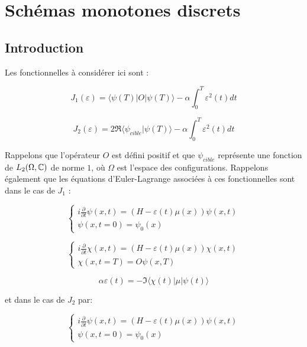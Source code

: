 \chapter{Schémas monotones discrets}

\section{Introduction}
Les fonctionnelles à considérer ici sont :

\begin{equation}
J_1(\varepsilon) = \langle \psi(T)|O|\psi(T) \rangle - \alpha \int_0^T \varepsilon^2(t)dt
\end{equation}

\begin{equation}
J_2(\varepsilon) = 2\Re\langle \psi_{cible}|\psi(T)\rangle - \alpha \int_0^T \varepsilon^2(t)dt
\end{equation}

Rappelons que l'opérateur $O$ est défini positif et que $\psi_{cible}$ représente une fonction de $L_2(\Omega,\mathbb C)$ de norme $1$, où $\Omega$ est l'espace des configurations. Rappelons également que les équations d'Euler-Lagrange associées à ces fonctionnelles sont dans le cas de $J_1$ :

\begin{equation}
\begin{cases}
i \frac{\partial}{\partial t} \psi (x,t) = (H - \varepsilon(t)\mu(x))\psi(x,t)\\
\psi(x,t=0)=\psi_0(x)
\end{cases}
\end{equation}

\begin{equation}
\begin{cases}
i \frac{\partial}{\partial t} \chi (x,t) = (H - \varepsilon(t)\mu(x))\chi(x,t)\\
\chi(x,t=T)=O\psi(x,T)
\end{cases}
\end{equation}

\begin{equation}
\alpha\varepsilon(t) = -\Im \langle \chi(t)|\mu|\psi(t)\rangle 
\end{equation}

et dans le cas de $J_2$ par:

\begin{equation}
\begin{cases}
i \frac{\partial}{\partial t} \psi (x,t) = (H - \varepsilon(t)\mu(x))\psi(x,t)\\
\psi(x,t=0)=\psi_0(x)
\end{cases}
\end{equation}

